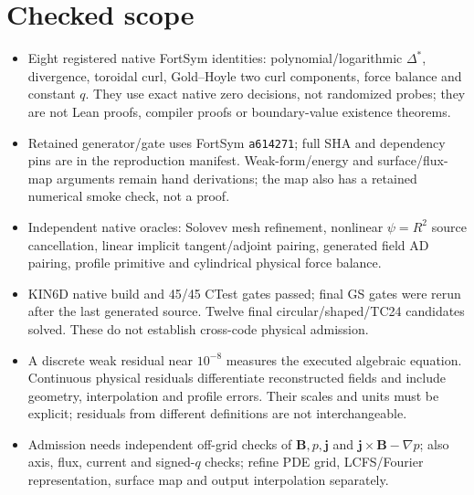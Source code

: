 \documentclass[11pt,a4paper]{article}
\newcommand{\ds}{\Delta^*}
\begin{document}
\section*{Checked scope}
\begin{itemize}
\item Eight registered native FortSym identities: polynomial/logarithmic $\ds$, divergence, toroidal curl, Gold--Hoyle two curl components, force balance and constant $q$. They use exact native zero decisions, not randomized probes; they are not Lean proofs, compiler proofs or boundary-value existence theorems.
\item Retained generator/gate uses FortSym \texttt{a614271}; full SHA and dependency pins are in the reproduction manifest. Weak-form/energy and surface/flux-map arguments remain hand derivations; the map also has a retained numerical smoke check, not a proof.
\item Independent native oracles: Solovev mesh refinement, nonlinear $\psi=R^2$ source cancellation, linear implicit tangent/adjoint pairing, generated field AD pairing, profile primitive and cylindrical physical force balance.
\item KIN6D native build and 45/45 CTest gates passed; final GS gates were rerun after the last generated source. Twelve final circular/shaped/TC24 candidates solved. These do not establish cross-code physical admission.
\item A discrete weak residual near $10^{-8}$ measures the executed algebraic equation. Continuous physical residuals differentiate reconstructed fields and include geometry, interpolation and profile errors. Their scales and units must be explicit; residuals from different definitions are not interchangeable.
\item Admission needs independent off-grid checks of $\mathbf B,p,\mathbf j$ and $\mathbf j\times\mathbf B-\nabla p$; also axis, flux, current and signed-$q$ checks; refine PDE grid, LCFS/Fourier representation, surface map and output interpolation separately.
\end{itemize}
\end{document}
